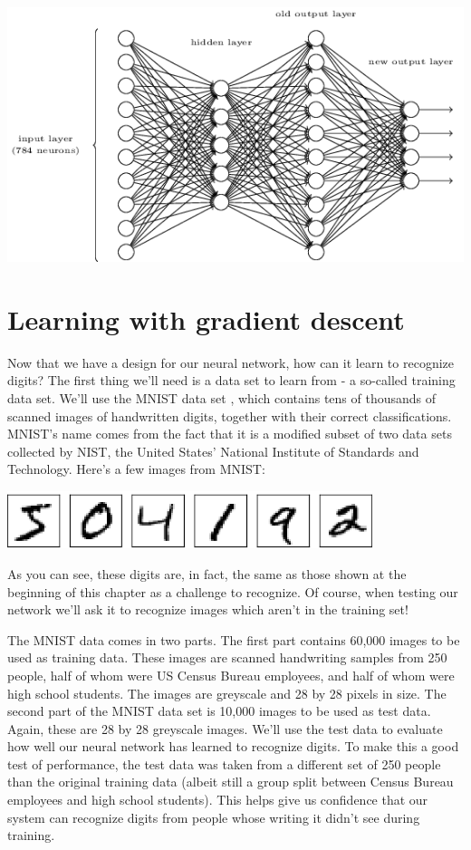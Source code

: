 {\centering
\includegraphics[width=\textwidth,]{pic/tikz13}
\par}


\section{Learning with gradient descent}

Now that we have a design for our neural network, how can it learn to recognize digits? The first thing we'll need is a data set to learn from - a so-called training data set. We'll use the MNIST data set \cite{LeCun2019}, which contains tens of thousands of scanned images of handwritten digits, together with their correct classifications. MNIST's name comes from the fact that it is a modified subset of two data sets collected by NIST, the United States' National Institute of Standards and Technology. Here's a few images from MNIST:

{\centering
\includegraphics[width=0.8\textwidth,]{pic/digits_separate}
\par}

As you can see, these digits are, in fact, the same as those shown at the beginning of this chapter as a challenge to recognize. Of course, when testing our network we'll ask it to recognize images which aren't in the training set!

The MNIST data comes in two parts. The first part contains 60,000 images to be used as training data. These images are scanned handwriting samples from 250 people, half of whom were US Census Bureau employees, and half of whom were high school students. The images are greyscale and 28 by 28 pixels in size. The second part of the MNIST data set is 10,000 images to be used as test data. Again, these are 28 by 28 greyscale images. We'll use the test data to evaluate how well our neural network has learned to recognize digits. To make this a good test of performance, the test data was taken from a different set of 250 people than the original training data (albeit still a group split between Census Bureau employees and high school students). This helps give us confidence that our system can recognize digits from people whose writing it didn't see during training.

